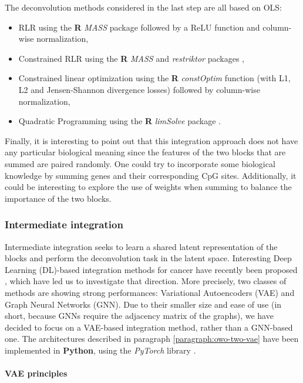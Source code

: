 \documentclass{article}
\begin{document}
The deconvolution methods considered in the last step are all based on OLS:
\begin{itemize}
    \item RLR using the \textbf{R} \textit{MASS} package \cite{MASS} followed by a ReLU function and column-wise normalization,
    \item Constrained RLR using the \textbf{R} \textit{MASS} and \textit{restriktor} packages \cite{MASS, restriktor},
    \item Constrained linear optimization using the \textbf{R} \textit{constOptim} function (with L1, L2 and Jensen-Shannon divergence losses) followed by column-wise normalization,
    \item Quadratic Programming using the \textbf{R} \textit{limSolve} package \cite{limSolve}.
\end{itemize}

Finally, it is interesting to point out that this integration approach does not have any particular biological meaning since the features of the two blocks that are summed are paired randomly.
One could try to incorporate some biological knowledge by summing genes and their corresponding CpG sites.
Additionally, it could be interesting to explore the use of weights when summing to balance the importance of the two blocks.

\subsubsection{Intermediate integration}\label{subsubsec:intermediate-integration}

Intermediate integration seeks to learn a shared latent representation of the blocks and perform the deconvolution task in the latent space.
Interesting Deep Learning (DL)-based integration methods for cancer have recently been proposed \cite{leng_2022_benchmark}, which have led us to investigate that direction.
More precisely, two classes of methods are showing strong performances: Variational Autoencoders (VAE) and Graph Neural Networks (GNN).
Due to their smaller size and ease of use (in short, because GNNs require the adjacency matrix of the graphs), we have decided to focus on a VAE-based integration method, rather than a GNN-based one.
The architectures described in paragraph \ref{paragraph:owo-two-vae} have been implemented in \textbf{Python}, using the \textit{PyTorch} library \cite{Paszke_PyTorch_An_Imperative_2019}.

\paragraph{VAE principles}\label{paragraph:vae-principles}
\end{document}
